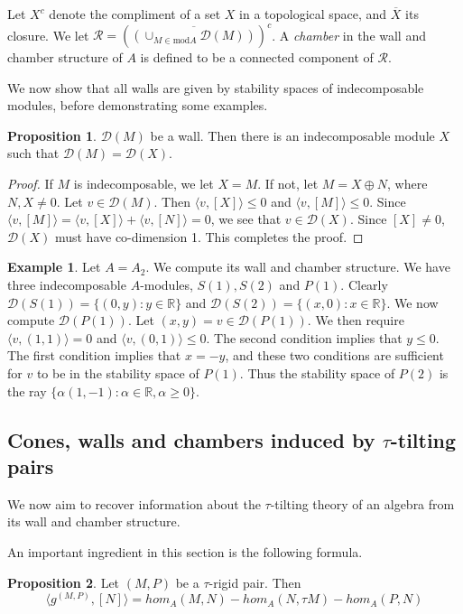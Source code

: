 \documentclass[]{article}
\theoremstyle{definition}
\newtheorem{proposition}{Proposition}[section]
\newtheorem{example}{Example}[section]
\newcommand{\tu}{\ensuremath{\tau}}
\begin{document}
Let $X^c$ denote the compliment of a set $X$ in a topological space, and $\overline{X}$ its closure. We let $\mathcal{R} = (\overline{(\cup_{M \in \text{mod} A} \mathcal{D}(M))})^c$. A \textit{chamber} in the wall and chamber structure of $A$ is defined to be a connected component of $\mathcal{R}$.

We now show that all walls are given by stability spaces of indecomposable modules, before demonstrating some examples.

\begin{proposition}
	$\mathcal{D}(M)$ be a wall. Then there is an indecomposable module $X$ such that $\mathcal{D}(M) = \mathcal{D}(X)$.
\end{proposition}

\begin{proof}
	If $M$ is indecomposable, we let $X = M$. If not, let $M = X\oplus N$, where $N,X \neq 0$. Let $v \in \mathcal{D}(M)$. Then $\langle v,[X]\rangle \leq 0$ and $\langle v,[M]\rangle \leq 0$. Since $\langle v,[M]\rangle = \langle v,[X]\rangle + \langle v,[N]\rangle = 0$, we see that $v \in \mathcal{D}(X)$. Since $[X] \neq 0$, $\mathcal{D}(X)$ must have co-dimension 1. This completes the proof.
\end{proof}

\begin{example}
	Let $A = A_2$. We compute its wall and chamber structure. We have three indecomposable $A$-modules, $S(1),S(2)$ and $P(1)$. Clearly $\mathcal{D}(S(1)) = \{(0,y): y \in \mathbb{R}\}$ and $\mathcal{D}(S(2)) = \{(x,0): x \in \mathbb{R}\}$. We now compute $\mathcal{D}(P(1))$. Let $(x,y) = v \in \mathcal{D}(P(1))$. We then require $\langle v,(1,1)\rangle = 0$ and $\langle v,(0,1)\rangle \leq 0$. The second condition implies that $y \leq 0$. The first condition implies that $x = -y$, and these two conditions are sufficient for $v$ to be in the stability space of $P(1)$. Thus the stability space of $P(2)$ is the ray $\{\alpha(1,-1) :  \alpha \in \mathbb{R}, \alpha \geq 0\}$. 
\end{example}


\subsection{Cones, walls and chambers induced by \tu-tilting pairs}
We now aim to recover information about the \tu-tilting theory of an algebra from its wall and chamber structure.

An important ingredient in this section is the following formula.
\begin{proposition}
	Let $(M,P)$ be a \tu-rigid pair. Then
 \[\langle g^{(M,P)},[N]\rangle = hom_A(M,N) - hom_A(N,\tau M) - hom_A(P,N)\]
\end{proposition}
\end{document}
